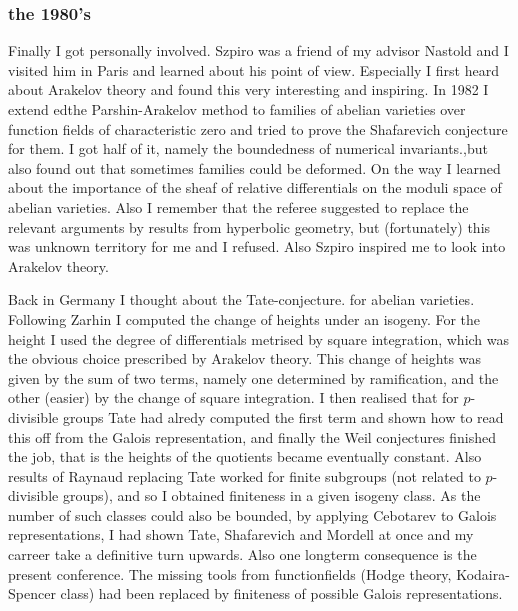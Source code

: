 \documentclass{beamer}
\begin{document}
\begin{frame}
\frametitle{the 1980's}

Finally I got personally involved. Szpiro was a friend of my advisor Nastold and I visited him in Paris and learned about his point of view. Especially I first heard about Arakelov theory and found this very interesting and inspiring. In 1982 I extend edthe Parshin-Arakelov method to families of abelian varieties over function fields of characteristic zero and tried to prove the Shafarevich conjecture for them.  I got half of it, namely the boundedness of numerical invariants.,but also found out that sometimes families could be deformed. On the way I learned about the importance of the sheaf of relative differentials on the moduli space of abelian varieties. Also I remember that the referee suggested to replace the relevant arguments by results from hyperbolic geometry,  but (fortunately) this was unknown territory for me and I refused. Also Szpiro inspired me to look into Arakelov theory.
\end{frame}
\begin{frame}

Back in Germany I thought about the Tate-conjecture. for abelian varieties. Following Zarhin I computed the change of heights under an isogeny. For the height I used the degree of differentials metrised by square integration, which was the obvious choice prescribed by Arakelov theory. This change of heights was given by the sum of two terms, namely one determined by ramification, and the other (easier) by the change of square integration. I then realised that for $p$-divisible groups Tate had alredy computed the first term and shown how to read this off from the Galois representation, and finally the Weil conjectures finished the job,  that is the heights of the quotients became eventually constant. Also results of Raynaud replacing Tate worked for finite subgroups (not related to $p$-divisible groups), and so I obtained finiteness in a given isogeny class. As the number of such classes could also be bounded, by applying Cebotarev to Galois representations, I had shown Tate, Shafarevich and Mordell at once and my carreer take a definitive turn upwards. Also one longterm consequence is the present conference. The missing tools from functionfields (Hodge theory, Kodaira-Spencer class) had been replaced by finiteness of possible Galois representations.


\end{frame}
\end{document}
